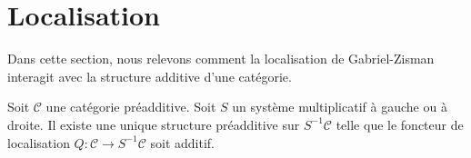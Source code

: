 \section{Localisation}
\label{section-localization}

\noindent
Dans cette section, nous relevons comment la localisation de Gabriel-Zisman interagit avec
la structure additive d'une catégorie.

\begin{lemma}
\label{lemma-localization-preadditive}
Soit $\mathcal{C}$ une catégorie préadditive.
Soit $S$ un système multiplicatif à gauche ou à droite.
Il existe une unique structure préadditive sur
$S^{-1}\mathcal{C}$ telle que le foncteur de localisation
$Q : \mathcal{C} \to S^{-1}\mathcal{C}$ soit additif.
\end{lemma}

